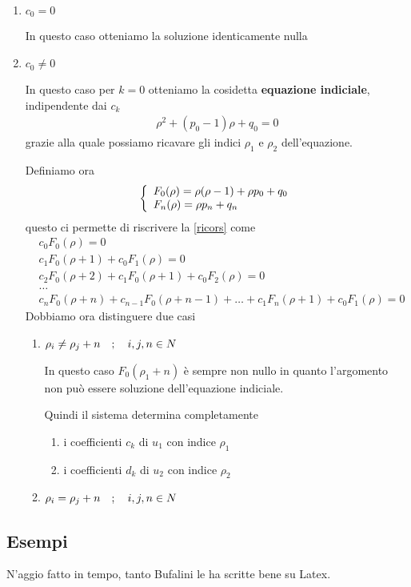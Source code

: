 \begin{enumerate}
	\item $c_0 = 0$
	
	In questo caso otteniamo la soluzione identicamente nulla
	\item $c_0 \neq 0$
	
	In questo caso per $k=0$ otteniamo la cosidetta \textbf{equazione indiciale}, indipendente dai $c_k$
	\begin{align}
		\rho^2 + (p_0 -1)\rho + q_0 = 0
	\end{align}
	grazie alla quale possiamo ricavare gli indici $\rho_1$ e $\rho_2$ dell'equazione. 
	
	Definiamo ora
	\begin{align}
		\double{F_0(\rho) = \rho(\rho -1) + \rho p_0 + q_0}{F_n(\rho) = \rho p_n + q_n \hfill}
	\end{align}
	questo ci permette di riscrivere la \ref{ricors} come
	\begin{align}
		&c_0 F_0(\rho) = 0\\
		&c_1 F_0(\rho + 1) + c_0 F_1(\rho) = 0\\
		&c_2 F_0(\rho + 2) + c_1 F_0(\rho + 1) + c_0 F_2(\rho) = 0\\
		&\dots \nonumber\\
		&c_n F_0(\rho + n) + c_{n-1} F_0(\rho + n-1) + \dots + c_1 F_n(\rho + 1) + c_0 F_1(\rho) = 0	 	
	\end{align}
 	Dobbiamo ora distinguere due casi
 	\begin{enumerate}
 		\item $\rho_i \neq \rho_j + n \quad ; \quad i,j,n \in N$
 		
 		In questo caso $F_0(\rho_1 + n)$ è sempre non nullo in quanto l'argomento non può essere soluzione dell'equazione indiciale. 
 		
 		Quindi il sistema determina completamente \begin{enumerate}
 			\item i coefficienti $c_k$ di $u_1$ con indice $\rho_1$
 			\item i coefficienti $d_k$ di $u_2$ con indice $\rho_2$
 		\end{enumerate}
 		
 		\item $\rho_i =    \rho_j + n \quad ; \quad i,j,n \in N$
 	\end{enumerate}
\end{enumerate}



\newpage

\subsection{Esempi}
N'aggio fatto in tempo, tanto Bufalini le ha scritte bene su Latex.